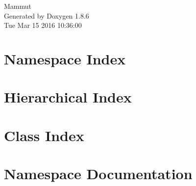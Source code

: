 \documentclass[twoside]{book}
\newcommand{\clearemptydoublepage}{%
  \newpage{\pagestyle{empty}\cleardoublepage}%
}
\begin{document}
\hypersetup{pageanchor=false}
\begin{titlepage}
\vspace*{7cm}
\begin{center}%
{\Large Mammut }\\
\vspace*{1cm}
{\large Generated by Doxygen 1.8.6}\\
\vspace*{0.5cm}
{\small Tue Mar 15 2016 10:36:00}\\
\end{center}
\end{titlepage}
\clearemptydoublepage
\tableofcontents
\clearemptydoublepage
{}
\hypersetup{pageanchor=true}

\chapter{Namespace Index}

\chapter{Hierarchical Index}

\chapter{Class Index}

\chapter{Namespace Documentation}

\end{document}
